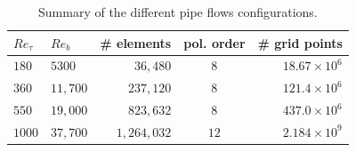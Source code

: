 \documentclass{sig-alternate}
\begin{document}
\begin{table}
\centering
\caption{Summary of the different pipe flows configurations.}
\begin{tabular}{llrcr} 
\hline
$Re_{\tau}$&$Re_{b}$&\# elements & pol. order & \# grid points\\ 
\hline
$180$ & $5300$ & $36,480$ & $8$ & $18.67 \times 10^6$\\
$360$ & $11,700$ & $237,120$ & $8$ & $121.4 \times 10^6$\\ 
$550$ & $19,000$ & $823,632$ & $8$ & $437.0 \times 10^6$\\ 
$1000$ & $37,700$ & $1,264,032$ & $12$ & $2.184 \times 10^9$\\
\hline
\end{tabular}
\label{tab:pipe_conf}
\end{table}



\end{document}
